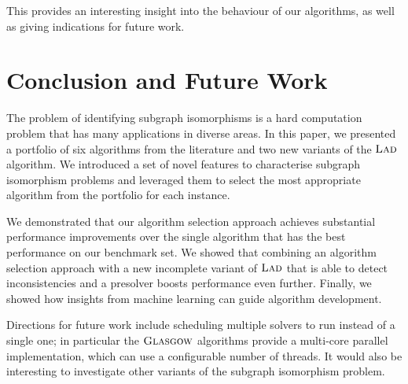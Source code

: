 \documentclass{llncs}
\newcommand{\Glasgow}{$\textsc{Glasgow}$\xspace}
\newcommand{\LAD}{$\textsc{Lad}$\xspace}
\begin{document}
This provides an interesting insight into the behaviour of our algorithms, as
well as giving indications for future work.

\section{Conclusion and Future Work}\label{sec:concs}

The problem of identifying subgraph isomorphisms is a hard computation problem that has many
applications in diverse areas. In this paper, we presented a portfolio of six algorithms from the
literature and two new variants of the \LAD algorithm. We introduced a set of novel features to
characterise subgraph isomorphism problems and leveraged them to select the most appropriate
algorithm from the portfolio for each instance.

We demonstrated that our algorithm selection approach achieves substantial
performance improvements over the single algorithm that has the best performance
on our benchmark set. We showed that combining an algorithm selection approach
with a new incomplete variant of \LAD that is able to detect inconsistencies
and a presolver boosts performance even further. Finally, we showed how
insights from machine learning can guide algorithm development.

Directions for future work include scheduling multiple solvers to run instead of
a single one; in particular the \Glasgow algorithms provide a multi-core
parallel implementation, which can use a configurable number of threads. It
would also be interesting to investigate other variants of the subgraph
isomorphism problem.



\end{document}
